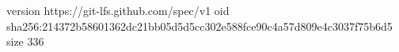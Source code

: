 version https://git-lfs.github.com/spec/v1
oid sha256:214372b58601362dc21bb05d5d5cc302e588fce90c4a57d809e4c3037f75b6d5
size 336
